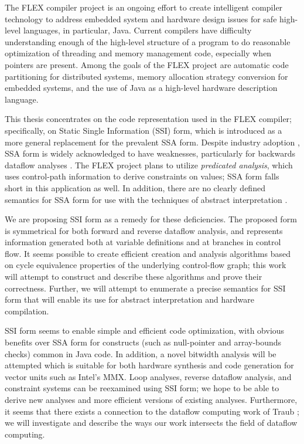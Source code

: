 \documentclass[12pt,oneside]{article}
\begin{document}
The FLEX compiler project is an ongoing effort to create intelligent
compiler technology to address embedded system and hardware design
issues for safe high-level languages, in particular, Java.
Current compilers have difficulty understanding  enough of the
high-level structure 
of a program to do reasonable optimization of threading and memory
management code, especially when pointers are present. Among the goals
of the FLEX project are automatic code partitioning for distributed
systems, memory allocation strategy conversion for embedded systems,
and the use of Java as a high-level hardware description language.

This thesis concentrates on the code representation used in the
FLEX compiler; specifically, on Static Single Information (SSI)
form, which is introduced as a more general replacement for the
prevalent SSA form.  Despite industry adoption
\cite{chow97:ssapre,chow96:hssa}, SSA form \cite{cytron91:ssa} is
widely acknowledged to have weaknesses, particularly for backwards
dataflow analyses \cite{johnson93:dfg}.  The FLEX project plans to utilize
\emph{predicated analysis}, which uses control-path information to
derive constraints on values; SSA form falls short in this application
as well.  In addition, there are no clearly defined semantics for SSA
form for use with the techniques of abstract interpretation
\cite{pingali90:dfg}.

We are proposing SSI form as a remedy for these deficiencies. The
proposed form is symmetrical for both forward and
reverse dataflow analysis, and represents information generated both
at variable definitions and at branches in control flow.  It seems
possible to create efficient creation and analysis algorithms based on
cycle equivalence properties of the underlying control-flow graph;
this work will attempt to construct and describe these algorithms and
prove their correctness.  Further, we will attempt to enumerate a
precise semantics for SSI form that will enable its use for abstract
interpretation and hardware compilation.

SSI form seems to enable simple and efficient code optimization, with obvious
benefits over SSA form for constructs (such as null-pointer and
array-bounds checks) common in Java code.  In addition, a novel
bitwidth analysis will be attempted which is suitable for both hardware
synthesis and code generation for vector units such as Intel's MMX.
Loop analyses, reverse dataflow analysis, and constraint systems can be
reexamined using SSI form; we hope to be able to derive new analyses
and more efficient versions of existing analyses.  Furthermore, it
seems that there exists a connection to the dataflow computing work of
Traub \cite{traub86:ttda}; we will investigate and describe the ways
our work intersects the field of dataflow computing.
\end{document}
